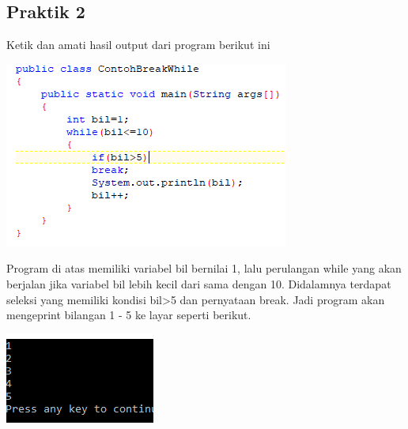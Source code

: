\documentclass[a4paper,12pt]{article}
\begin{document}
\subsection{Praktik 2}
Ketik dan amati hasil output dari program berikut ini\\
\begin{center}
    \includegraphics[scale=1]{image3}
\end{center}
Program di atas memiliki variabel bil bernilai 1, lalu perulangan while yang akan berjalan jika variabel bil lebih kecil dari sama dengan 10. Didalamnya terdapat seleksi yang memiliki kondisi bil>5 dan pernyataan break. Jadi program akan mengeprint bilangan 1 - 5 ke layar seperti berikut.
\begin{center}
    \includegraphics[scale=1]{image4}
\end{center}
\end{document}
